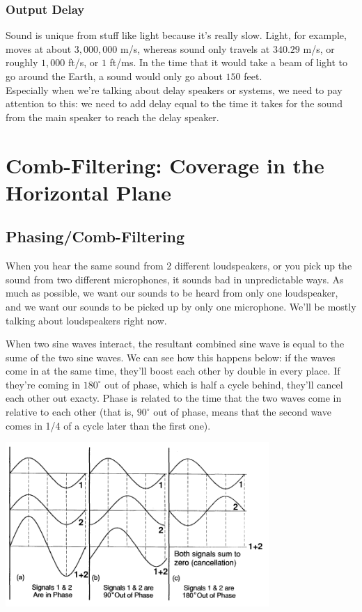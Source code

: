 \documentclass[a4paper]{article}
\begin{document}
\subsubsection{Output Delay}

Sound is unique from stuff like light because it's really slow. Light, for
example, moves at about $3,000,000$ m/s, whereas sound only travels at $340.29$
m/s, or roughly $1,000$ ft/s, or $1$ ft/ms.
In the time that it would take a beam of light to go around the Earth, a
sound would only go about $150$ feet.\\
Especially when we're talking about delay speakers or systems, we need to pay
attention to this: we need to add delay equal to the time it takes for the
sound from the main speaker to reach the delay speaker.

\section[Horizontal Coverage]{Comb-Filtering: Coverage in the Horizontal Plane}

\subsection{Phasing/Comb-Filtering}

When you hear the same sound from 2 different loudspeakers, or you pick up the
sound from two different microphones, it sounds bad in unpredictable ways. As
much as possible, we want our sounds to be heard from only one loudspeaker, and
we want our sounds to be picked up by only one microphone. We'll be mostly
talking about loudspeakers right now.

When two sine waves interact, the resultant combined sine wave is equal to the
sume of the two sine waves. We can see how this happens below: if the waves
come in at the same time, they'll boost each other by double in every place. If
they're coming in $180^\circ$ out of phase, which is half a cycle behind, 
they'll cancel each other out exacty. Phase is related to the time that the two
waves come in relative to each other (that is, $90^\circ$ out of phase, means
that the second wave comes in 1/4 of a cycle later than the first one).

\begin{center}
	\includegraphics[width=0.75\textwidth]{phase.png}
\end{center}
\end{document}
